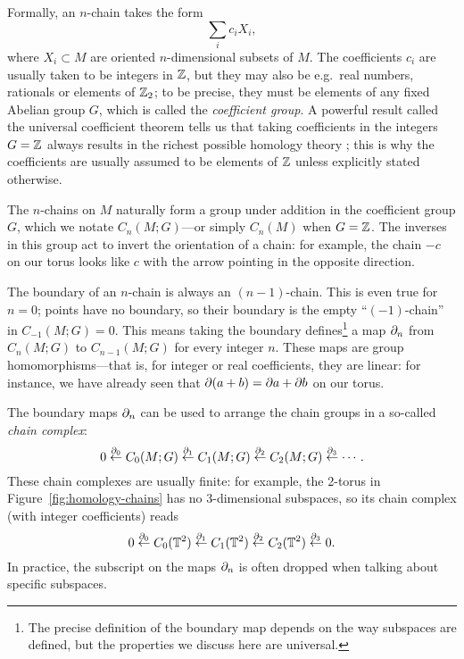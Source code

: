 Formally, an $n$-chain takes the form
\begin{equation*}
	\sum_i c_i X_i,
\end{equation*}
where $X_i\subset M$ are oriented $n$-dimensional subsets of $M$. The coefficients $c_i$ are usually taken to be integers in $\mathbb{Z}$, but they may also be e.g.\ real numbers, rationals or elements of $\mathbb{Z}_2$; to be precise, they must be elements of any fixed Abelian group $G$, which is called the \emph{coefficient group}. A powerful result called the universal coefficient theorem tells us that taking coefficients in the integers $G=\mathbb{Z}$ always results in the richest possible homology theory \parencite[\S3.A]{Hatcher_algebraic-topology}; this is why the coefficients are usually assumed to be elements of $\mathbb{Z}$ unless explicitly stated otherwise.

The $n$-chains on $M$ naturally form a group under addition in the coefficient group $G$, which we notate $C_n(M;G)$---or simply $C_n(M)$ when $G=\mathbb{Z}$. The inverses in this group act to invert the orientation of a chain: for example, the chain $-c$ on our torus looks like $c$ with the arrow pointing in the opposite direction.

The boundary of an $n$-chain is always an $(n-1)$-chain. This is even true for $n=0$; points have no boundary, so their boundary is the empty ``$(-1)$-chain'' in $C_{-1}(M;G) = 0$. This means taking the boundary defines\footnote{
	The precise definition of the boundary map depends on the way subspaces are defined, but the properties we discuss here are universal.}
a map $\partial_n$ from $C_n(M;G)$ to $C_{n-1}(M;G)$ for every integer $n$. These maps are group homomorphisms---that is, for integer or real coefficients, they are linear: for instance, we have already seen that $\partial(a+b) = \partial a + \partial b$ on our torus.

The boundary maps $\partial_n$ can be used to arrange the chain groups in a so-called \emph{chain complex}:
\begin{equation*}
	0 \overset{\partial_0}{\leftarrow} C_0(M;G) \overset{\partial_1}{\leftarrow} C_1(M;G) \overset{\partial_2}{\leftarrow} C_2(M;G) \overset{\partial_3}{\leftarrow} \cdots.
\end{equation*}
These chain complexes are usually finite: for example, the 2-torus in Figure~\ref{fig:homology-chains} has no 3-dimensional subspaces, so its chain complex (with integer coefficients) reads
\begin{equation*}
	0 \overset{\partial_0}{\leftarrow} C_0(\mathbb{T}^2) \overset{\partial_1}{\leftarrow} C_1(\mathbb{T}^2) \overset{\partial_2}{\leftarrow} C_2(\mathbb{T}^2) \overset{\partial_3}{\leftarrow} 0.
\end{equation*}
In practice, the subscript on the maps $\partial_n$ is often dropped when talking about specific subspaces.

